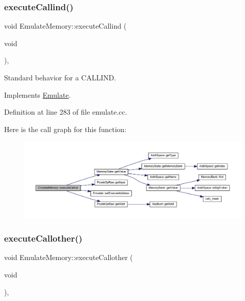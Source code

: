 \subsubsection{\texorpdfstring{executeCallind()}{executeCallind()}}
{\footnotesize\ttfamily void Emulate\+Memory\+::execute\+Callind (\begin{DoxyParamCaption}\item[{void}]{ }\end{DoxyParamCaption})\hspace{0.3cm}{\ttfamily [protected]}, {\ttfamily [virtual]}}



Standard behavior for a C\+A\+L\+L\+I\+ND. 



Implements \mbox{\hyperlink{class_emulate_aa3579bd388004b72fab0e62175aeb1a0}{Emulate}}.



Definition at line 283 of file emulate.\+cc.

Here is the call graph for this function\+:
\nopagebreak
\begin{figure}[H]
\begin{center}
\leavevmode
\includegraphics[width=350pt]{class_emulate_memory_af1c25ebc29e2e57ab762d878ac8103e4_cgraph}
\end{center}
\end{figure}
\mbox{\label{class_emulate_memory_a9a7bbbdeb9ca7f696fb8070119eb304a}} 
\subsubsection{\texorpdfstring{executeCallother()}{executeCallother()}}
{\footnotesize\ttfamily void Emulate\+Memory\+::execute\+Callother (\begin{DoxyParamCaption}\item[{void}]{ }\end{DoxyParamCaption})\hspace{0.3cm}{\ttfamily [protected]}, {\ttfamily [virtual]}}



